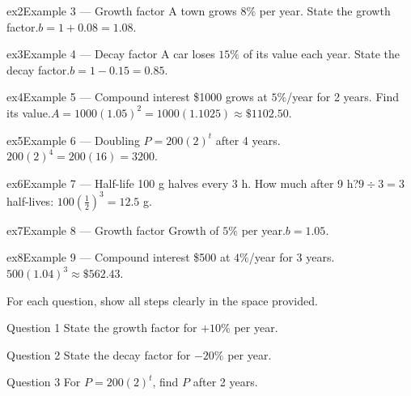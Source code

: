 \documentclass[11pt]{article}
\begin{document}
\begin{example}{ex2}{Example 3 --- Growth factor}
A town grows $8\%$ per year. State the growth factor.\soln $b=1+0.08=1.08$.
\end{example}

\begin{example}{ex3}{Example 4 --- Decay factor}
A car loses $15\%$ of its value each year. State the decay factor.\soln $b=1-0.15=0.85$.
\end{example}

\begin{example}{ex4}{Example 5 --- Compound interest}
\$1000 grows at $5\%$/year for 2 years. Find its value.\soln $A=1000(1.05)^2=1000(1.1025)\approx\$1102.50$.
\end{example}

\begin{example}{ex5}{Example 6 --- Doubling}
$P=200(2)^t$ after 4 years.\soln $200(2)^4=200(16)=3200$.
\end{example}

\begin{example}{ex6}{Example 7 --- Half-life}
100 g halves every 3 h. How much after 9 h?\soln $9\div3=3$ half-lives: $100\left(\tfrac12\right)^3=12.5$ g.
\end{example}

\begin{example}{ex7}{Example 8 --- Growth factor}
Growth of $5\%$ per year.\soln $b=1.05$.
\end{example}

\begin{example}{ex8}{Example 9 --- Compound interest}
\$500 at $4\%$/year for 3 years.\soln $500(1.04)^3\approx\$562.43$.
\end{example}

\clearpage
{}
For each question, show all steps clearly in the space provided.

\begin{qbox}{Question 1}
State the growth factor for $+10\%$ per year.\workspace{2.4cm}
\end{qbox}

\begin{qbox}{Question 2}
State the decay factor for $-20\%$ per year.\workspace{2.4cm}
\end{qbox}

\begin{qbox}{Question 3}
For $P=200(2)^t$, find $P$ after 2 years.\workspace{2.4cm}
\end{qbox}
\end{document}
